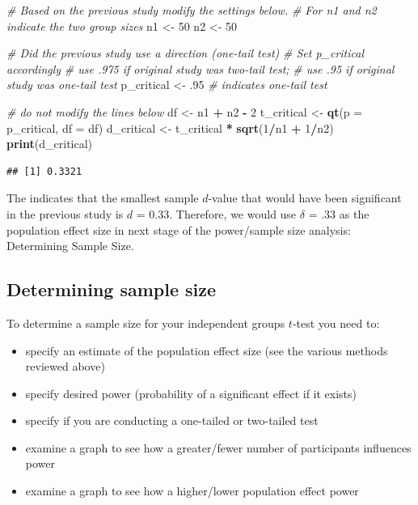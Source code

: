 \documentclass[
]{krantz}
\makeatletter
\newenvironment{Shaded}{\begin{snugshade}}{\end{snugshade}}
\newcommand{\CommentTok}[1]{\textcolor[rgb]{0.37,0.37,0.37}{\textit{#1}}}
\newcommand{\DataTypeTok}[1]{\textcolor[rgb]{0.27,0.27,0.27}{#1}}
\newcommand{\DecValTok}[1]{\textcolor[rgb]{0.06,0.06,0.06}{#1}}
\newcommand{\FloatTok}[1]{\textcolor[rgb]{0.06,0.06,0.06}{#1}}
\newcommand{\KeywordTok}[1]{\textcolor[rgb]{0.27,0.27,0.27}{\textbf{#1}}}
\newcommand{\NormalTok}[1]{#1}
\newcommand{\OperatorTok}[1]{\textcolor[rgb]{0.43,0.43,0.43}{\textbf{#1}}}
\newcommand{\StringTok}[1]{\textcolor[rgb]{0.5,0.5,0.5}{#1}}
\newenvironment{kframe}{%
\medskip{}
\setlength{\fboxsep}{.8em}
 \def\at@end@of@kframe{}%
 \ifinner\ifhmode%
  \def\at@end@of@kframe{\end{minipage}}%
  \begin{minipage}{\columnwidth}%
 \fi\fi%
 \def\FrameCommand##1{\hskip\@totalleftmargin \hskip-\fboxsep
 \colorbox{shadecolor}{##1}\hskip-\fboxsep
     \hskip-\linewidth \hskip-\@totalleftmargin \hskip\columnwidth}%
 \MakeFramed {\advance\hsize-\width
   \@totalleftmargin\z@ \linewidth\hsize
   \@setminipage}}%
 {\par\unskip\endMakeFramed%
 \at@end@of@kframe}
\renewenvironment{Shaded}{\begin{kframe}}{\end{kframe}}
\makeatother
\begin{document}
\begin{Shaded}
\begin{Highlighting}[]
\CommentTok{# Based on the previous study modify the settings below.}
\CommentTok{# For n1 and n2 indicate the two group sizes}
\NormalTok{n1 <-}\StringTok{ }\DecValTok{50}
\NormalTok{n2 <-}\StringTok{ }\DecValTok{50}

\CommentTok{# Did the previous study use a direction (one-tail test)}
\CommentTok{# Set p_critical accordingly}
\CommentTok{# use .975 if original study was two-tail test;}
\CommentTok{# use .95 if original study was one-tail test}
\NormalTok{p_critical <-}\StringTok{ }\FloatTok{.95} \CommentTok{# indicates one-tail test}

\CommentTok{# do not modify the lines below}
\NormalTok{df <-}\StringTok{ }\NormalTok{n1 }\OperatorTok{+}\StringTok{ }\NormalTok{n2 }\OperatorTok{-}\StringTok{ }\DecValTok{2}
\NormalTok{t_critical <-}\StringTok{ }\KeywordTok{qt}\NormalTok{(}\DataTypeTok{p =}\NormalTok{ p_critical, }\DataTypeTok{df =}\NormalTok{ df) }
\NormalTok{d_critical <-}\StringTok{ }\NormalTok{t_critical }\OperatorTok{*}\StringTok{ }\KeywordTok{sqrt}\NormalTok{(}\DecValTok{1}\OperatorTok{/}\NormalTok{n1 }\OperatorTok{+}\StringTok{ }\DecValTok{1}\OperatorTok{/}\NormalTok{n2)}
\KeywordTok{print}\NormalTok{(d_critical)}
\end{Highlighting}
\end{Shaded}

\begin{verbatim}
## [1] 0.3321
\end{verbatim}

The indicates that the smallest sample \(d\)-value that would have been significant in the previous study is \(d\) = 0.33. Therefore, we would use \(\delta\) = .33 as the population effect size in next stage of the power/sample size analysis: Determining Sample Size.

\hypertarget{determining-sample-size}{%
\subsection{Determining sample size}\label{determining-sample-size}}

To determine a sample size for your independent groups \(t\)-test you need to:

\begin{itemize}
\item
  specify an estimate of the population effect size (see the various methods reviewed above)
\item
  specify desired power (probability of a significant effect if it exists)
\item
  specify if you are conducting a one-tailed or two-tailed test
\item
  examine a graph to see how a greater/fewer number of participants influences power
\item
  examine a graph to see how a higher/lower population effect power
\end{itemize}
\end{document}

